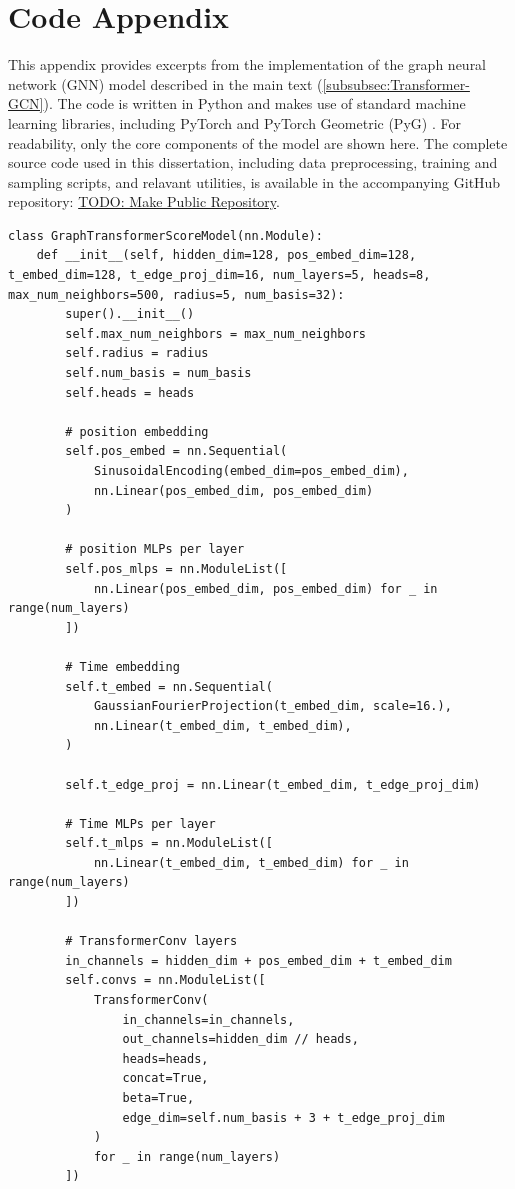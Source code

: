 \documentclass[a4paper,12pt]{article}
\begin{document}
\section{Code Appendix}
This appendix provides excerpts from the implementation of the graph neural network (GNN) model described in the main text (\cref{subsubsec:Transformer-GCN}). The code is written in Python and makes use of standard machine learning libraries, including PyTorch and PyTorch Geometric (PyG) \citep{PyG1.0,PyG2.0}. For readability, only the core components of the model are shown here. The complete source code used in this dissertation, including data preprocessing, training and sampling scripts, and relavant utilities, is available in the accompanying GitHub repository: \url{TODO: Make Public Repository}.
\begin{verbatim}
class GraphTransformerScoreModel(nn.Module):
    def __init__(self, hidden_dim=128, pos_embed_dim=128, t_embed_dim=128, t_edge_proj_dim=16, num_layers=5, heads=8, max_num_neighbors=500, radius=5, num_basis=32):
        super().__init__()
        self.max_num_neighbors = max_num_neighbors
        self.radius = radius
        self.num_basis = num_basis
        self.heads = heads

        # position embedding
        self.pos_embed = nn.Sequential(
            SinusoidalEncoding(embed_dim=pos_embed_dim),
            nn.Linear(pos_embed_dim, pos_embed_dim)
        )

        # position MLPs per layer
        self.pos_mlps = nn.ModuleList([
            nn.Linear(pos_embed_dim, pos_embed_dim) for _ in range(num_layers)
        ])

        # Time embedding
        self.t_embed = nn.Sequential(
            GaussianFourierProjection(t_embed_dim, scale=16.),
            nn.Linear(t_embed_dim, t_embed_dim),
        )

        self.t_edge_proj = nn.Linear(t_embed_dim, t_edge_proj_dim)

        # Time MLPs per layer
        self.t_mlps = nn.ModuleList([
            nn.Linear(t_embed_dim, t_embed_dim) for _ in range(num_layers)
        ])

        # TransformerConv layers
        in_channels = hidden_dim + pos_embed_dim + t_embed_dim
        self.convs = nn.ModuleList([
            TransformerConv(
                in_channels=in_channels,
                out_channels=hidden_dim // heads,
                heads=heads,
                concat=True,
                beta=True,
                edge_dim=self.num_basis + 3 + t_edge_proj_dim
            )
            for _ in range(num_layers)
        ])


\end{verbatim}
\end{document}

